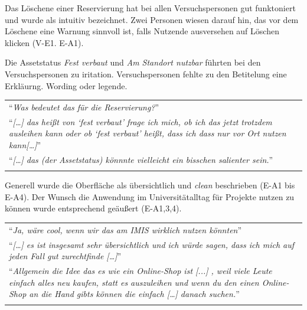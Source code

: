 Das Löschene einer Reservierung hat bei allen Versuchspersonen gut funktoniert und wurde als
intuitiv bezeichnet. Zwei Personen wiesen darauf hin, das vor dem Löschene eine Warnung sinnvoll ist,
falls Nutzende ausversehen auf Löschen klicken (V-E1. E-A1). 

Die Assetstatus \textit{Fest verbaut} und \textit{Am Standort nutzbar} führten bei den
Versuchspersonen zu iritation. Versuchspersonen fehlte zu den Betitelung eine Erkläurng.  Wording
oder legende.

\begin{longtable}{p{}} \arrayrulecolor{maincolor}\hline
  \enquote{\textit{Was bedeutet das für die Reservierung?}} \\
  \enquote{\textit{[\dots] das heißt von \enquote{fest verbaut} frage ich mich, ob ich das jetzt
  trotzdem ausleihen kann oder ob \enquote{fest verbaut} heißt, dass ich dass nur vor Ort nutzen
  kann[\dots]}} \\
  \enquote{\textit{[\dots] das (der Assetstatus) könnnte vielleicht ein bisschen salienter sein.}}
  \\
  \arrayrulecolor{maincolor}\hline
\end{longtable}

Generell wurde die Oberfläche als übersichtlich und \textit{clean} beschrieben (E-A1 bis E-A4). Der
Wunsch die Anwendung im Universitätalltag für Projekte nutzen zu können wurde entsprechend geäußert
(E-A1,3,4).

\begin{longtable}{p{}} \arrayrulecolor{maincolor}\hline
  \enquote{\textit{Ja, wäre cool, wenn wir das am IMIS wirklich nutzen könnten}}\\
  \enquote{\textit{[\dots] es ist insgesamt sehr übersichtlich und ich würde sagen, dass ich mich
  auf jeden Fall gut zurechtfinde [\dots]}} \\
  \enquote{\textit{Allgemein die Idee das es wie ein Online-Shop ist [...] , weil viele Leute
  einfach alles neu kaufen, statt es auszuleihen und wenn du den einen Online-Shop an die Hand gibts
  können die einfach [\dots] danach suchen.}} \\
  \arrayrulecolor{maincolor}\hline
\end{longtable}


